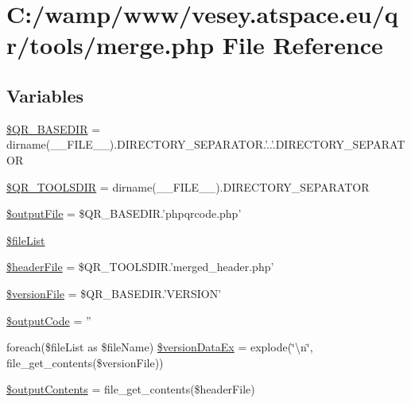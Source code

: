 \hypertarget{merge_8php}{\section{C\-:/wamp/www/vesey.atspace.\-eu/qr/tools/merge.php File Reference}
\label{merge_8php}
}
\subsection*{Variables}
\begin{DoxyCompactItemize}
\item 
\hyperlink{merge_8php_a2b9a0b4d98e1e23a5460e3639fdae91b}{\$\-Q\-R\-\_\-\-B\-A\-S\-E\-D\-I\-R} = dirname(\-\_\-\-\_\-\-F\-I\-L\-E\-\_\-\-\_\-).D\-I\-R\-E\-C\-T\-O\-R\-Y\-\_\-\-S\-E\-P\-A\-R\-A\-T\-O\-R.'..'.D\-I\-R\-E\-C\-T\-O\-R\-Y\-\_\-\-S\-E\-P\-A\-R\-A\-T\-O\-R
\item 
\hyperlink{merge_8php_ae417e541a5565832b8f420a2a802677e}{\$\-Q\-R\-\_\-\-T\-O\-O\-L\-S\-D\-I\-R} = dirname(\-\_\-\-\_\-\-F\-I\-L\-E\-\_\-\-\_\-).D\-I\-R\-E\-C\-T\-O\-R\-Y\-\_\-\-S\-E\-P\-A\-R\-A\-T\-O\-R
\item 
\hyperlink{merge_8php_ad936d9f60325793d1fb7bc155bb36607}{\$output\-File} = \$Q\-R\-\_\-\-B\-A\-S\-E\-D\-I\-R.'phpqrcode.\-php'
\item 
\hyperlink{merge_8php_ae2e98845ed3d2254c1482c0c3b6f9ff3}{\$file\-List}
\item 
\hyperlink{merge_8php_af243fbc21177be2a85033a3596457d23}{\$header\-File} = \$Q\-R\-\_\-\-T\-O\-O\-L\-S\-D\-I\-R.'merged\-\_\-header.\-php'
\item 
\hyperlink{merge_8php_a89ce9781b8ddbd4548b0bd11b2a11b30}{\$version\-File} = \$Q\-R\-\_\-\-B\-A\-S\-E\-D\-I\-R.'V\-E\-R\-S\-I\-O\-N'
\item 
\hyperlink{merge_8php_af6f6877b476d46f61a45ef886ba846ee}{\$output\-Code} = ''
\item 
foreach(\$file\-List as \$file\-Name) \hyperlink{merge_8php_afdf5d77c1948029c7d27d6011e876a61}{\$version\-Data\-Ex} = explode(\char`\"{}\textbackslash{}n\char`\"{}, file\-\_\-get\-\_\-contents(\$version\-File))
\item 
\hyperlink{merge_8php_a5e82fe2dc648d283b082d2f7cb25c506}{\$output\-Contents} = file\-\_\-get\-\_\-contents(\$header\-File)
\end{DoxyCompactItemize}


